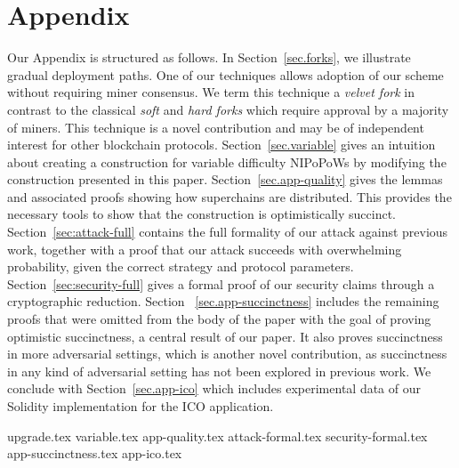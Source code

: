 \appendix
\section*{Appendix}

Our Appendix is structured as follows. In Section~\ref{sec.forks}, we illustrate
gradual deployment paths. One of our techniques allows adoption of our scheme
without requiring miner consensus. We term this technique a \emph{velvet fork}
in contrast to the classical \emph{soft} and \emph{hard forks} which require
approval by a majority of miners. This technique is a novel contribution and may
be of independent interest for other blockchain protocols.
Section~\ref{sec.variable} gives an intuition about creating a construction for
variable difficulty NIPoPoWs by modifying the construction presented in this
paper.
Section~\ref{sec.app-quality} gives the lemmas and associated proofs showing how
superchains are distributed. This provides the necessary tools to show that the
construction is optimistically succinct. Section~\ref{sec:attack-full} contains
the full formality of our attack against previous work, together with a proof
that our attack succeeds with overwhelming probability, given the correct
strategy and protocol parameters. Section~\ref{sec:security-full} gives a formal
proof of our security claims through a cryptographic reduction. Section~
\ref{sec.app-succinctness} includes the remaining proofs that were omitted from
the body of the paper with the goal of proving optimistic succinctness, a
central result of our paper. It also proves succinctness in more adversarial
settings, which is another novel contribution, as succinctness in any kind of
adversarial setting has not been explored in previous work. We conclude with
Section~\ref{sec.app-ico} which includes experimental data of our Solidity
implementation for the ICO application.

{upgrade.tex}
{variable.tex}
{app-quality.tex}
{attack-formal.tex}
{security-formal.tex}
{app-succinctness.tex}
{app-ico.tex}
